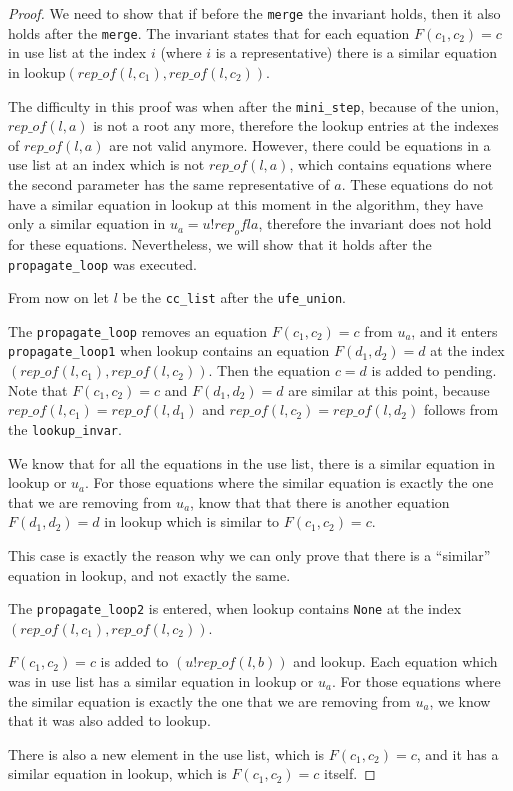 \begin{proof}
We need to show that if before the \lstinline{merge} the invariant holds, then it also holds after the \lstinline{merge}. The invariant states that for each equation $F(c_1, c_2) = c$ in use list at the index $i$ (where $i$ is a representative) there is a similar equation in lookup$(rep\_of(l, c_1), rep\_of(l, c_2))$.

The difficulty in this proof was when after the \lstinline{mini_step}, because of the union, $rep\_of(l, a)$ is not a root any more, therefore the lookup entries at the indexes of $rep\_of(l, a)$ are not valid anymore. However, there could be equations in a use list at an index which is not $rep\_of(l, a)$, which contains equations where the second parameter has the same representative of $a$. These equations do not have a similar equation in lookup at this moment in the algorithm, they have only a similar equation in $u_a = u ! rep_of l a$, therefore the invariant does not hold for these equations. Nevertheless, we will show that it holds after the \lstinline{propagate_loop} was executed.

From now on let $l$ be the \lstinline{cc_list} after the \lstinline{ufe_union}.

The \lstinline{propagate_loop} removes an equation $F(c_1, c_2) = c$ from $u_a$, and it enters \lstinline{propagate_loop1} when lookup contains an equation $F(d_1, d_2) = d$ at the index $(rep\_of(l, c_1), rep\_of(l, c_2))$. Then the equation $c = d$ is added to pending. Note that $F(c_1, c_2) = c$ and $F(d_1, d_2) = d$ are similar at this point, because $rep\_of(l, c_1) = rep\_of(l, d_1)$ and $rep\_of(l, c_2) = rep\_of(l, d_2)$ follows from the \lstinline{lookup_invar}.

We know that for all the equations in the use list, there is a similar equation in lookup or $u_a$. For those equations where the similar equation is exactly the one that we are removing from $u_a$, know that that there is another equation $F(d_1, d_2) = d$ in lookup which is similar to $F(c_1, c_2) = c$.

This case is exactly the reason why we can only prove that there is a ``similar'' equation in lookup, and not exactly the same.

The \lstinline{propagate_loop2} is entered, when lookup contains \lstinline{None} at the index $(rep\_of(l, c_1), rep\_of(l, c_2))$.

$F(c_1, c_2) = c$ is added to $(u ! rep\_of(l, b))$ and lookup.
Each equation which was in use list has a similar equation in lookup or $u_a$. For those equations where the similar equation is exactly the one that we are removing from $u_a$, we know that it was also added to lookup.

There is also a new element in the use list, which is $F(c_1, c_2) = c$, and it has a similar equation in lookup, which is $F(c_1, c_2) = c$ itself.
\end{proof}

